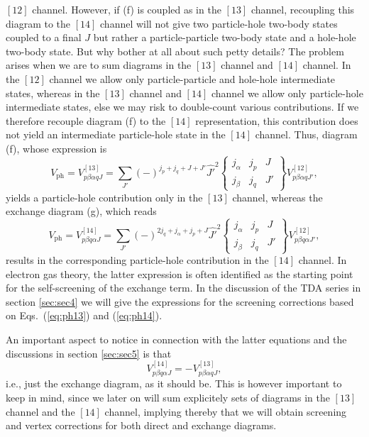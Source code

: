 \documentclass{article}
\begin{document}
$[12]$ channel. However, if (f) is coupled as in the $[13]$ channel,
recoupling this diagram to the $[14]$ channel will not give
two particle-hole
two-body states coupled to a final $J$ but rather
a particle-particle two-body state and a hole-hole  two-body state.
But why bother at all about such petty details? The problem arises when we
are to  sum diagrams in the $[13]$ channel and $[14]$ channel.
In the $[12]$ channel we allow only particle-particle and hole-hole
intermediate states, whereas in the $[13]$ channel and $[14]$ channel
we allow only particle-hole intermediate states, else we may risk
to double-count various contributions.
If we therefore recouple
diagram (f) to the $[14]$ representation, this contribution
does not yield an intermediate particle-hole state
in the $[14]$ channel.
Thus, diagram (f), whose expression is
\begin{equation}
      V_{\mathrm{ph}}=V_{p\beta \alpha q J}^{[13]}=
      {\displaystyle \sum_{J'}}(-)^{j_p+j_q+J+J'}\hat{J'}^2
      \left\{
      \begin{array}{ccc}
       j_{\alpha}&j_p&J\\j_{\beta}&j_q&J'
      \end{array}
       \right\}
       V_{p\beta \alpha q J'}^{[12]},
       \label{eq:ph13}
\end{equation}
yields a particle-hole contribution only in the $[13]$ channel,
whereas the exchange diagram (g), which reads
\begin{equation}
      V_{\mathrm{ph}}=V_{p\beta q\alpha J}^{[14]}=
      {\displaystyle \sum_{J'}}(-)^{2j_q+j_{\alpha}+j_p+J}\hat{J'}^2
      \left\{
      \begin{array}{ccc}
       j_{\alpha}&j_p&J\\j_{\beta}&j_{q}&J'
      \end{array}
       \right\}
       V_{p\beta q\alpha J'}^{[12]},
       \label{eq:ph14}
\end{equation}
results in the corresponding particle-hole contribution in the
$[14]$ channel.
In electron gas theory, the latter expression
is often identified as the starting point for the self-screening
of the exchange term. In the discussion of the TDA series in
section \ref{sec:sec4} we will give the expressions for the screening
corrections based on Eqs.\ (\ref{eq:ph13}) and (\ref{eq:ph14}).

An important aspect to notice in connection with the latter
equations and the discussions in  section \ref{sec:sec5} is that
\begin{equation}
    V_{p\beta q\alpha J}^{[14]}=-V_{p\beta \alpha q J}^{[13]},
\end{equation}
i.e., just the exchange diagram, as it should be.
This is however important to keep in mind, since we later
on will sum explicitely sets of diagrams in the
$[13]$ channel and the $[14]$ channel, implying thereby that
we will obtain screening and vertex corrections
for  both direct and exchange  diagrams.
\end{document}
